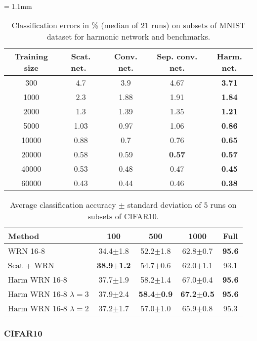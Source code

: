 \documentclass[conference]{IEEEtran}
\begin{document}
\begin{table}
\centering
\tabcolsep = 1.1mm
\caption{Classification errors in \% (median of 21 runs) on subsets of MNIST dataset for harmonic network and benchmarks.} \label{tab:lim_data_mnist}
 \begin{tabular}{|c|cccc|}
  \hline
  \footnotesize{Training size} & \footnotesize{Scat. net.~\cite{Bruna13}} & \footnotesize{Conv. net.} & \footnotesize{Sep. conv. net.} & \footnotesize{Harm. net.} \\
  \hline
  300 & 4.7 & 3.9 & 4.67 & \textbf{3.71} \\
  1000 & 2.3 & 1.88 & 1.91 & \textbf{1.84} \\
  2000 & 1.3 & 1.39 & 1.35 & \textbf{1.21} \\
  5000 & 1.03 & 0.97 & 1.06 & \textbf{0.86} \\
  10000 & 0.88 & 0.7 & 0.76 & \textbf{0.65} \\
  20000 & 0.58 & 0.59 & \textbf{0.57} & \textbf{0.57} \\
  40000 & 0.53 & 0.48 & 0.47 & \textbf{0.45} \\
  60000 & 0.43 & 0.44 & 0.46 & \textbf{0.38} \\
  \hline
 \end{tabular}
\end{table}

\begin{table}
\centering
\caption{Average classification accuracy $\pm$ standard deviation of 5 runs on subsets of CIFAR10.} \label{tab:lim_data_cifar}
\begin{tabular}{|l|c|c|c|c|}
 \hline
 \textbf{Method} & \textbf{100} & \textbf{500} & \textbf{1000} & \textbf{Full} \\
 \hline
 WRN 16-8 & 34.4$\pm$1.8 & 52.2$\pm$1.8 & 62.8$\pm$0.7 & \textbf{95.6} \\
 Scat + WRN~\cite{Oyallon18} & \textbf{38.9$\pm$1.2} & 54.7$\pm$0.6 & 62.0$\pm$1.1 & 93.1 \\
 Harm WRN 16-8 & 37.7$\pm$1.9 & 58.2$\pm$1.4 & 67.0$\pm$0.4 & \textbf{95.6} \\
 Harm WRN 16-8 $\lambda=3$ & 37.9$\pm$2.4 & \textbf{58.4$\pm$0.9} & \textbf{67.2$\pm$0.5} & \textbf{95.6} \\
 Harm WRN 16-8 $\lambda=2$ & 37.2$\pm$1.7 & 57.0$\pm$1.0 & 65.9$\pm$0.8 & 95.3 \\
 \hline
\end{tabular}
\end{table}

\subsubsection{CIFAR10}
\end{document}
